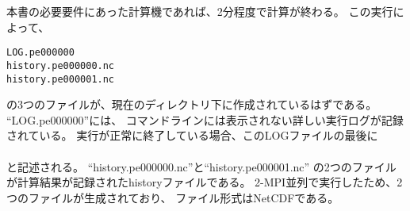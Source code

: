 本書の必要要件にあった計算機であれば、2分程度で計算が終わる。
\noindent この実行によって、\\
\begin{alltt}
  LOG.pe000000
  history.pe000000.nc
  history.pe000001.nc
\end{alltt}
の3つのファイルが、現在のディレクトリ下に作成されているはずである。
``LOG.pe000000''には、
コマンドラインには表示されない詳しい実行ログが記録されている。
実行が正常に終了している場合、このLOGファイルの最後に\\

\\

\noindent と記述される。
``history.pe000000.nc''と``history.pe000001.nc''
の2つのファイルが計算結果が記録されたhistoryファイルである。
2-MPI並列で実行したため、2つのファイルが生成されており、
ファイル形式はNetCDFである。

